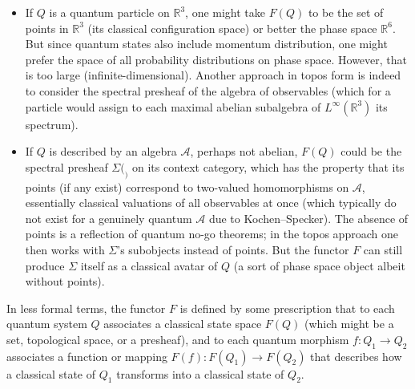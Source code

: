 \begin{itemize}
    \item If $Q$ is a quantum particle on $\mathbb{R}^3$, one might take $F(Q)$ to be the set of points in $\mathbb{R}^3$ (its classical configuration space) or better the phase space $\mathbb{R}^6$. But since quantum states also include momentum distribution, one might prefer the space of all probability distributions on phase space. However, that is too large (infinite-dimensional). Another approach in topos form is indeed to consider the spectral presheaf of the algebra of observables (which for a particle would assign to each maximal abelian subalgebra of $L^\infty(\mathbb{R}^3)$ its spectrum).
    
    \item If $Q$ is described by an algebra $\mathcal{A}$, perhaps not abelian, $F(Q)$ could be the spectral presheaf $\Sigma(_)$ on its context category, which has the property that its points (if any exist) correspond to two-valued homomorphisms on $\mathcal{A}$, essentially classical valuations of all observables at once (which typically do not exist for a genuinely quantum $\mathcal{A}$ due to Kochen–Specker). The absence of points is a reflection of quantum no-go theorems; in the topos approach one then works with $\Sigma$'s subobjects instead of points. But the functor $F$ can still produce $\Sigma$ itself as a classical avatar of $Q$ (a sort of phase space object albeit without points).
\end{itemize}

\medskip

In less formal terms, the functor $F$ is defined by some prescription that to each quantum system $Q$ associates a classical state space $F(Q)$ (which might be a set, topological space, or a presheaf), and to each quantum morphism $f: Q_1 \to Q_2$ associates a function or mapping $F(f): F(Q_1) \to F(Q_2)$ that describes how a classical state of $Q_1$ transforms into a classical state of $Q_2$.

\medskip

